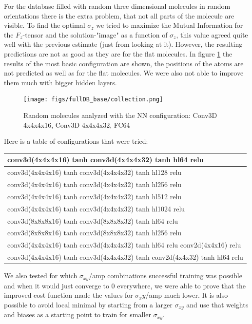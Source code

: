 \documentclass{article}
\begin{document}
For the database filled with random three dimensional molecules in random orientations there is the extra problem, that not all parts of the molecule are visible. To find the optimal $\sigma_z$ we tried to maximize the Mutual Information for the $F_z$-tensor and the solution-"image" as a function of $\sigma_z$, this value agreed quite well with the previous estimate (just from looking at it). However, the resulting predictions are not as good as they are for the flat molecules. In figure \ref{fig:resultsfullDB} the results of the  most basic configuration are shown, the positions of the atoms are not predicted as well as for the flat molecules. We were also not able to improve them much with bigger hidden layers.

\begin{figure}[htbp]
	\begin{center}
		\texttt{[image: figs/fullDB\_base/collection.png]}
		\caption{Random molecules analyzed with the NN configuration: Conv3D 4x4x4x16, Conv3D 4x4x4x32, FC64}
		\label{fig:resultsfullDB}
	\end{center}
\end{figure}

Here is a table of configurations that were tried:

\begin{center}
\begin{tabular}{|l|}
\hline conv3d(4x4x4x16) tanh conv3d(4x4x4x32) tanh hl64 relu \\
\hline conv3d(4x4x4x16) tanh conv3d(4x4x4x32) tanh hl128 relu \\
\hline conv3d(4x4x4x16) tanh conv3d(4x4x4x32) tanh hl256 relu \\
\hline conv3d(4x4x4x16) tanh conv3d(4x4x4x32) tanh hl512 relu \\
\hline conv3d(4x4x4x16) tanh conv3d(4x4x4x32) tanh hl1024 relu \\
\hline conv3d(8x8x8x16) tanh conv3d(8x8x8x32) tanh hl64 relu \\
\hline conv3d(8x8x8x16) tanh conv3d(8x8x8x32) tanh hl256 relu \\
\hline conv3d(4x4x4x16) tanh conv3d(4x4x4x32) tanh hl64 relu conv2d(4x4x16) relu \\
\hline conv3d(4x4x4x16) tanh conv3d(4x4x4x32) tanh conv2d(4x4x32) tanh hl64 relu \\
\hline
\end{tabular}
\end{center}

We also tested for which $\sigma_{xy}$/amp combinations successful training was possible and when it would just converge to 0 everywhere, we were able to prove that the improved cost function made the values for $\sigma_xy$/amp much lower. It is also possible to avoid local minimal by starting from a larger $\sigma_{xy}$ and use that weights and biases as a starting point to train for smaller $\sigma_{xy}$.
\end{document}
